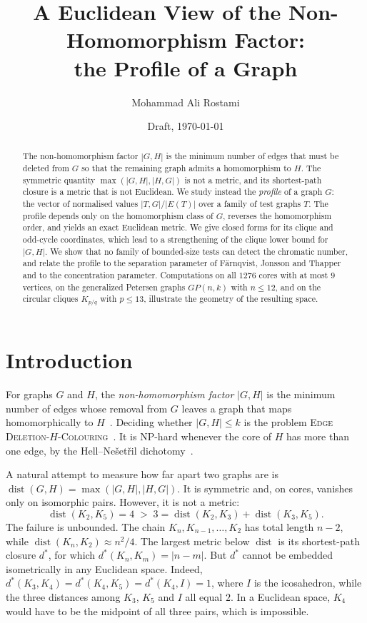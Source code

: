 \documentclass{article}
\title{A Euclidean View of the Non-Homomorphism Factor:\\
       the Profile of a Graph}
\author{Mohammad Ali Rostami}
\date{Draft, \today}
\begin{document}
\maketitle

\begin{abstract}
The non-homomorphism factor $|G,H|$ is the minimum number of edges that must
be deleted from $G$ so that the remaining graph admits a homomorphism to $H$.
The symmetric quantity $\max(|G,H|,|H,G|)$ is not a metric, and its
shortest-path closure is a metric that is not Euclidean.  We study instead
the \emph{profile} of a graph $G$: the vector of normalised values
$|T,G|/|E(T)|$ over a family of test graphs $T$.  The profile depends only
on the homomorphism class of $G$, reverses the homomorphism order, and yields
an exact Euclidean metric.  We give closed forms for its clique and
odd-cycle coordinates, which lead to a strengthening of the clique lower
bound for $|G,H|$.  We show that no family of bounded-size tests can detect
the chromatic number, and relate the profile to the separation parameter of
F\"arnqvist, Jonsson and Thapper and to the concentration parameter.
Computations on all $1276$ cores with at most $9$ vertices, on the
generalized Petersen graphs $GP(n,k)$ with $n\le12$, and on the circular
cliques $K_{p/q}$ with $p\le13$, illustrate the geometry of the resulting
space.
\end{abstract}

\section{Introduction}

For graphs $G$ and $H$, the \emph{non-homomorphism factor} $|G,H|$ is the
minimum number of edges whose removal from $G$ leaves a graph that maps
homomorphically to $H$~\cite{khoshkha2005}.  Deciding whether $|G,H|\le k$
is the problem \textsc{Edge Deletion-$H$-Colouring}~\cite{foucaud2019}.  It
is NP-hard whenever the core of $H$ has more than one edge, by the
Hell--Ne\v{s}et\v{r}il dichotomy~\cite{hell2004}.

A natural attempt to measure how far apart two graphs are is
$\operatorname{dist}(G,H)=\max(|G,H|,|H,G|)$.  It is symmetric and, on
cores, vanishes only on isomorphic pairs.  However, it is not a metric:
\[
  \operatorname{dist}(K_2,K_5)=4\;>\;3=\operatorname{dist}(K_2,K_3)+\operatorname{dist}(K_3,K_5).
\]
The failure is unbounded.  The chain $K_n,K_{n-1},\dots,K_2$ has total
length $n-2$, while $\operatorname{dist}(K_n,K_2)\approx n^2/4$.  The
largest metric below $\operatorname{dist}$ is its shortest-path closure
$d^*$, for which $d^*(K_n,K_m)=|n-m|$.  But $d^*$ cannot be embedded
isometrically in any Euclidean space.  Indeed, $d^*(K_3,K_4)=d^*(K_4,K_5)=d^*(K_4,I)=1$,
where $I$ is the icosahedron, while the three distances among $K_3$, $K_5$
and $I$ all equal $2$.  In a Euclidean space, $K_4$ would have to be the
midpoint of all three pairs, which is impossible.
\end{document}
